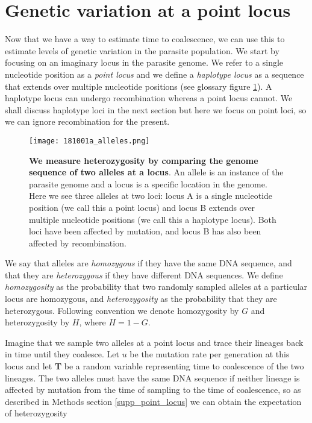 \documentclass[_main.tex]{subfiles}
\begin{document}
\section*{Genetic variation at a point locus} 
\label{main_point_locus}

Now that we have a way to estimate time to coalescence, we can use this to estimate levels of genetic variation in the parasite population.  We start by focusing on an imaginary locus in the parasite genome.  We refer to a single nucleotide position as a \textit{point locus} and we define a \textit{haplotype locus} as a sequence that extends over multiple nucleotide positions (see glossary figure \ref{fig:supp_graph_17}).  A haplotype locus can undergo recombination whereas a point locus cannot.  We shall discuss haplotype loci in the next section but here we focus on point loci, so we can ignore recombination for the present.

\begin{figure}[h!]
\centering
\texttt{[image: 181001a\_alleles.png]}
\caption{\textbf{We measure heterozygosity by comparing the genome sequence of two alleles at a locus}. An allele is an instance of the parasite genome and a locus is a specific location in the genome.  Here we see three alleles at two loci: locus A is a single nucleotide position (we call this a point locus) and locus B extends over multiple nucleotide positions (we call this a haplotype locus).  Both loci have been affected by mutation, and locus B has also been affected by recombination.}
\label{fig:supp_graph_17}
\end{figure}

We say that alleles are \textit{homozygous} if they have the same DNA sequence, and that they are \textit{heterozygous} if they have different DNA sequences.  We define \textit{homozygosity} as the probability that two randomly sampled alleles at a particular locus are homozygous, and \textit{heterozygosity} as the probability that they are heterozygous.  Following convention we denote homozygosity by $G$ and heterozygosity by $H$, where $H = 1 - G$.

Imagine that we sample two alleles at a point locus and trace their lineages back in time until they coalesce.  Let $u$ be the mutation rate per generation at this locus and let \textbf{T} be a random variable representing time to coalescence of the two lineages.  The two alleles must have the same DNA sequence if neither lineage is affected by mutation from the time of sampling to the time of coalescence, so as described in Methods section \ref{supp_point_locus} we can obtain the expectation of heterozygosity
\end{document}
